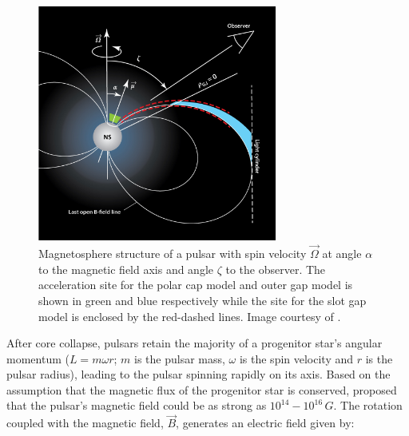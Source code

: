 \begin{figure}[ht]
	\centering
	\includegraphics[width=0.7\textwidth]{04_Introduction/Images/pulsar_wind_nebula/pulsar.jpeg}
	\caption{Magnetosphere structure of a pulsar with spin velocity $\vec{\Omega}$ at angle $\alpha$ to the magnetic field axis and angle $\zeta$ to the observer. The acceleration site for the polar cap model and outer gap model is shown in green and blue respectively while the site for the slot gap model is enclosed by the red-dashed lines. Image courtesy of \cite{2014ARA&A..52..211C}.}
	\label{fig:chapter1_magnetosphere_structure}
\end{figure}
\newpar
After core collapse, pulsars retain the majority of a progenitor star's angular momentum ($L=m\omega r$; $m$ is the pulsar mass, $\omega$ is the spin velocity and $r$ is the pulsar radius), leading to the pulsar spinning rapidly on its axis. Based on the assumption that the magnetic flux of the progenitor star is conserved, \cite{1964ApJ...140.1309W} proposed that the pulsar's magnetic field could be as strong as $10^{14}-10^{16}\,\si{G}$. The rotation coupled with the magnetic field, $\vec{B}$, generates an electric field given by:

